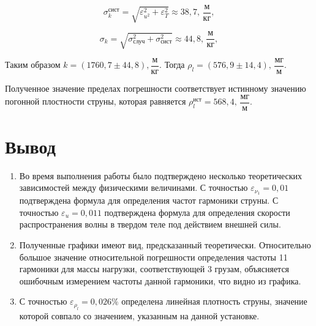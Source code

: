 \documentclass[a4paper,12pt]{article}
\begin{document}
	\begin{equation}
		\sigma_k^{\text{сист}} = \sqrt{ \varepsilon_{u^2}^2 + \varepsilon_T^2 } \approx 38,7\text{, $\dfrac{\text{м}}{\text{кг}}$},
	\end{equation}
	
	\begin{equation}
		\sigma_k = \sqrt{\sigma_\text{случ}^2 + \sigma_\text{сист}^2} \approx 44,8\text{, $\dfrac{\text{м}}{\text{кг}}$},
	\end{equation}

	Таким образом $k = (1760,7 \pm 44,8) {, \dfrac{\text{м}}{\text{кг}}} $.
	Тогда \underline{ $\rho_l = (576,9 \pm 14,4) \text{, $\dfrac{\text{мг}}{\text{м}}$}$}.
	
	Полученное значение пределах погрешности соответствует истинному значению погонной плостности струны, которая равняется $\rho^{\text{ист}}_l = 568,4\text{, $\dfrac{\text{мг}}{\text{м}}$} $. 
	\section{Вывод}
	
	\begin{enumerate}
		\item Во время выполнения работы было подтверждено несколько теоретических зависимостей между физическими величинами. С точностью $\varepsilon_{\nu_{1}} = 0,01$ подтверждена формула для определения частот гармоники струны. С точностью  $\varepsilon_{u} = 0,011$ подтверждена формула для определения скорости распространения волны в твердом теле под действием внешней силы.
		\item Полученные графики имеют вид, предсказанный теоретически. Относительно большое значение относительной погрешности определения частоты 11 гармоники для массы нагрузки, соответствующей 3 грузам, объясняется ошибочным измерением частоты данной гармоники, что видно из графика. 
		\item С точностью $ \varepsilon_{\rho_{l}} = 0,026 \%$ определена линейная плотность струны, значение которой совпало со значением, указанным на данной установке.
	\end{enumerate}
\end{document}
